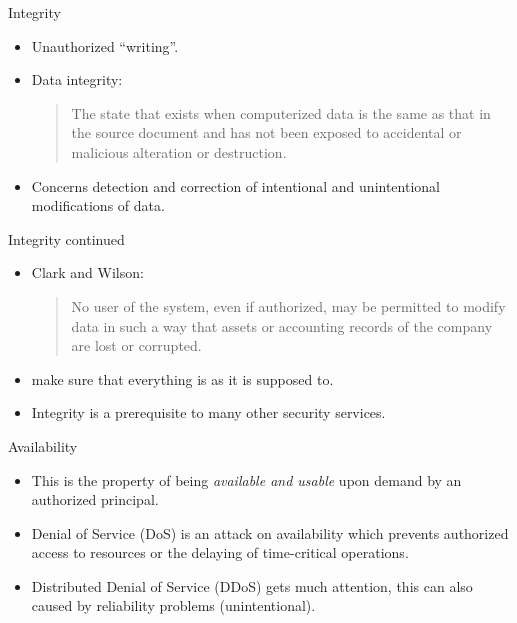 \begin{frame}
  \begin{block}{Integrity}
    \begin{itemize}
      \item Unauthorized \enquote{writing}.

      \item Data integrity: \blockquote{The state that exists when computerized 
          data is the same as that in the source document and has not been exposed 
          to accidental or malicious alteration or destruction.}

      \item Concerns detection and correction of intentional and unintentional 
        modifications of data.
    \end{itemize}
  \end{block}
\end{frame}

\begin{frame}
  \begin{block}{Integrity continued}
    \begin{itemize}
      \item Clark and Wilson:
        \blockquote{No user of the system, even if authorized, may be permitted to 
          modify data in such a way that assets or accounting records of the 
          company are lost or corrupted.}

      \item \Ie make sure that everything is as it is supposed to.

      \item Integrity is a prerequisite to many other security services.
    \end{itemize}
  \end{block}
\end{frame}

\begin{frame}
  \begin{block}{Availability}
    \begin{itemize}
      \item This is the property of being \emph{available and usable} upon demand 
        by an authorized principal.

      \item Denial of Service (DoS) is an attack on availability which prevents 
        authorized access to resources or the delaying of time-critical 
        operations.

      \item Distributed Denial of Service (DDoS) gets much attention, this can 
        also caused by reliability problems (unintentional).
    \end{itemize}
  \end{block}
\end{frame}

